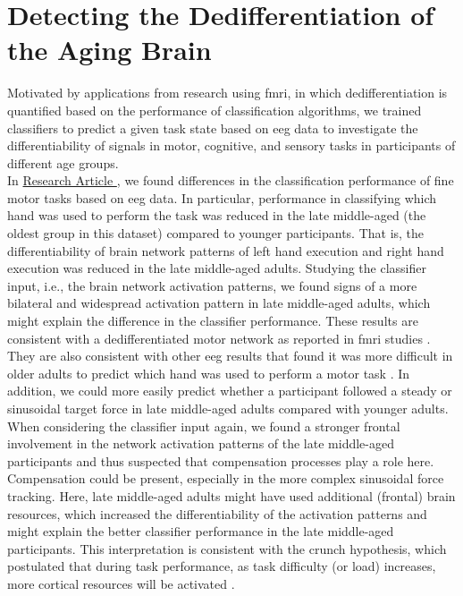 \section{Detecting the Dedifferentiation of the Aging Brain}
Motivated by applications from research using \gls{fmri}, in which dedifferentiation is quantified based on the performance of classification algorithms, we trained classifiers to predict a given task state based on \gls{eeg} data to investigate the differentiability of signals in motor, cognitive, and sensory tasks in participants of different age groups.\\
In \hyperref[results:paperI]{Research Article }, we found differences in the classification performance of fine motor tasks based on \gls{eeg} data. In particular, performance in classifying which hand was used to perform the task was reduced in the late middle-aged (the oldest group in this dataset) compared to younger participants. That is, the differentiability of brain network patterns of left hand execution and right hand execution was reduced in the late middle-aged adults. Studying the classifier input, i.e., the brain network activation patterns, we found signs of a more bilateral and widespread activation pattern in late middle-aged adults, which might explain the difference in the classifier performance. These results are consistent with a dedifferentiated motor network as reported in \gls{fmri} studies \cite{Carb2011, Cassedy2020}. They are also consistent with other \gls{eeg} results that found it was more difficult in older adults to predict which hand was used to perform a motor task \cite{Chen2019, Zich2015}. In addition, we could more easily predict whether a participant followed a steady or sinusoidal target force in late middle-aged adults compared with younger adults. When considering the classifier input again, we found a stronger frontal involvement in the network activation patterns of the late middle-aged participants and thus suspected that compensation processes play a role here. Compensation could be present, especially in the more complex sinusoidal force tracking. Here, late middle-aged adults might have used additional (frontal) brain resources, which increased the differentiability of the activation patterns and might explain the better classifier performance in the late middle-aged participants. This interpretation is consistent with the \gls{crunch} hypothesis, which postulated that during task performance, as task difficulty (or load) increases, more cortical resources will be activated \cite{Festini2018}.\\
